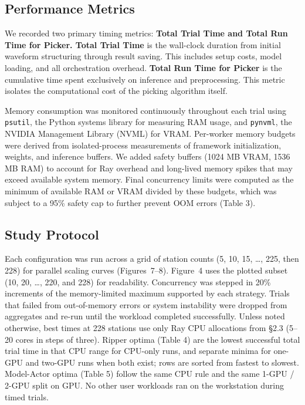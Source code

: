 \subsection{Performance Metrics}

We recorded two primary timing metrics: \textbf{Total Trial Time and Total Run Time for Picker. Total Trial Time} is the wall-clock duration from initial waveform structuring through result saving. This includes setup costs, model loading, and all orchestration overhead. \textbf{Total Run Time for Picker} is the cumulative time spent exclusively on inference and preprocessing. This metric isolates the computational cost of the picking algorithm itself.

Memory consumption was monitored continuously throughout each trial using \texttt{psutil}, the Python systems library for measuring RAM usage, and \texttt{pynvml}, the NVIDIA Management Library (NVML) for VRAM. Per-worker memory budgets were derived from isolated-process measurements of framework initialization, weights, and inference buffers. We added safety buffers (1024 MB VRAM, 1536 MB RAM) to account for Ray overhead and long-lived memory spikes that may exceed available system memory. Final concurrency limits were computed as the minimum of available RAM or VRAM divided by these budgets, which was subject to a 95\% safety cap to further prevent OOM errors (Table 3).

\subsection{Study Protocol}

Each configuration was run across a grid of station counts (5, 10, 15, …, 225, then 228) for parallel scaling curves (Figures~7--8). Figure~4 uses the plotted subset (10, 20, …, 220, and 228) for readability. Concurrency was stepped in 20\% increments of the memory-limited maximum supported by each strategy. Trials that failed from out-of-memory errors or system instability were dropped from aggregates and re-run until the workload completed successfully. Unless noted otherwise, best times at 228 stations use only Ray CPU allocations from \S2.3 (5–20 cores in steps of three). Ripper optima (Table 4) are the lowest successful total trial time in that CPU range for CPU-only runs, and separate minima for one-GPU and two-GPU runs when both exist; rows are sorted from fastest to slowest. Model-Actor optima (Table 5) follow the same CPU rule and the same 1-GPU / 2-GPU split on GPU. No other user workloads ran on the workstation during timed trials.

